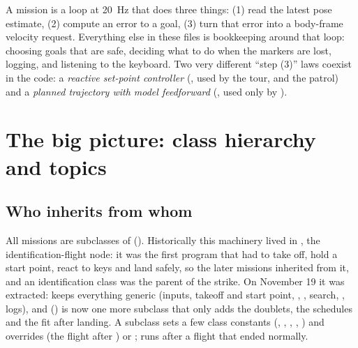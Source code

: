\begin{intuition}
A mission is a loop at 20~Hz that does three things: (1) read the latest pose estimate, (2) compute an error to a
goal, (3) turn that error into a body-frame velocity request. Everything else in these files is bookkeeping around
that loop: choosing goals that are safe, deciding what to do when the markers are lost, logging, and listening to
the keyboard. Two very different ``step (3)'' laws coexist in the code: a \emph{reactive set-point controller}
(, used by the tour,  and the patrol) and a \emph{planned trajectory with
model feedforward} (, used only by ).
\end{intuition}

\section{The big picture: class hierarchy and topics}

\subsection{Who inherits from whom}

All missions are subclasses of  (). Historically this machinery lived in
, the identification-flight node: it was the first program that had to take off, hold a start
point, react to keys and land safely, so the later missions inherited from it, and an identification class was the
parent of the strike. On November 19 it was extracted:  keeps everything generic (inputs, takeoff
and start point, , , search, , logs), and 
() is now one more subclass that only adds the doublets, the schedules and the
fit after landing. A subclass sets a few class constants (, ,
, , ) and overrides  (the flight
after ) or ;  runs after a flight that ended normally.

